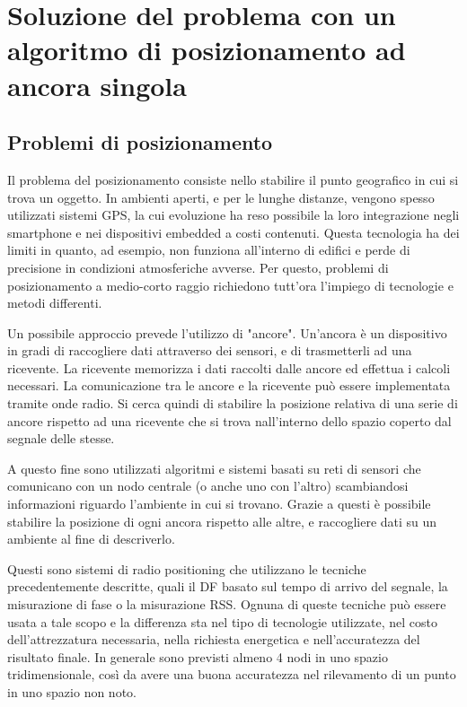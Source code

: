 \chapter{Soluzione del problema con un algoritmo di posizionamento ad ancora singola}
\section{Problemi di posizionamento}
Il problema del posizionamento consiste nello stabilire il punto geografico in cui si trova un oggetto. In ambienti aperti, e per le lunghe distanze, vengono spesso utilizzati sistemi GPS, la cui evoluzione ha reso possibile la loro integrazione negli smartphone e nei dispositivi embedded a costi contenuti. Questa tecnologia ha dei limiti in quanto, ad esempio, non funziona all'interno di edifici e perde di precisione in condizioni atmosferiche avverse. Per questo, problemi di posizionamento a medio-corto raggio richiedono tutt'ora l'impiego di tecnologie  e metodi differenti. 

Un possibile approccio prevede l'utilizzo di "ancore". Un'ancora è un dispositivo in gradi di raccogliere dati attraverso dei sensori, e di trasmetterli ad una ricevente. La ricevente memorizza i dati raccolti dalle ancore ed effettua i calcoli necessari. La comunicazione tra le ancore e la ricevente può essere implementata tramite onde radio. Si cerca quindi di stabilire la posizione relativa di una serie di ancore rispetto ad una ricevente che si trova nall'interno dello spazio coperto dal segnale delle stesse.

A questo fine sono utilizzati algoritmi e sistemi basati su reti di sensori che comunicano con un nodo centrale (o anche uno con l'altro) scambiandosi informazioni riguardo l'ambiente in cui si trovano. Grazie a questi è possibile stabilire la posizione di ogni ancora rispetto alle altre, e raccogliere dati su un ambiente al fine di descriverlo. 

Questi sono sistemi di radio positioning che utilizzano le tecniche precedentemente descritte, quali il DF basato sul tempo di arrivo del segnale, la misurazione di fase o la misurazione RSS. Ognuna di queste tecniche può essere usata a tale scopo e la differenza sta nel tipo di tecnologie utilizzate, nel costo dell'attrezzatura necessaria, nella richiesta energetica e nell'accuratezza del risultato finale.
In generale sono previsti almeno 4 nodi in uno spazio tridimensionale, così da avere una buona accuratezza nel rilevamento di un punto in uno spazio non noto. 

